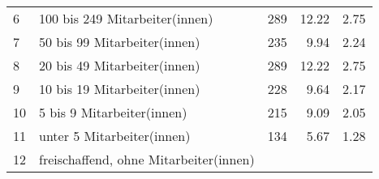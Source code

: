 \begin{longtable}{lXrrr}
     6 &
     \multicolumn{1}{X}{ 100 bis 249 Mitarbeiter(innen)   } &


       \num{289} &
       \num[round-mode=places,round-precision=2]{12.22} &
         \num[round-mode=places,round-precision=2]{2.75} \\

     7 &
     \multicolumn{1}{X}{ 50 bis 99 Mitarbeiter(innen)   } &


       \num{235} &
       \num[round-mode=places,round-precision=2]{9.94} &
         \num[round-mode=places,round-precision=2]{2.24} \\

     8 &
     \multicolumn{1}{X}{ 20 bis 49 Mitarbeiter(innen)   } &


       \num{289} &
       \num[round-mode=places,round-precision=2]{12.22} &
         \num[round-mode=places,round-precision=2]{2.75} \\

     9 &
     \multicolumn{1}{X}{ 10 bis 19 Mitarbeiter(innen)   } &


       \num{228} &
       \num[round-mode=places,round-precision=2]{9.64} &
         \num[round-mode=places,round-precision=2]{2.17} \\

     10 &
     \multicolumn{1}{X}{ 5 bis 9 Mitarbeiter(innen)   } &


       \num{215} &
       \num[round-mode=places,round-precision=2]{9.09} &
         \num[round-mode=places,round-precision=2]{2.05} \\

     11 &
     \multicolumn{1}{X}{ unter 5 Mitarbeiter(innen)   } &


       \num{134} &
       \num[round-mode=places,round-precision=2]{5.67} &
         \num[round-mode=places,round-precision=2]{1.28} \\

     12 &
     \multicolumn{1}{X}{ freischaffend, ohne Mitarbeiter(innen)   } &



\end{longtable}
